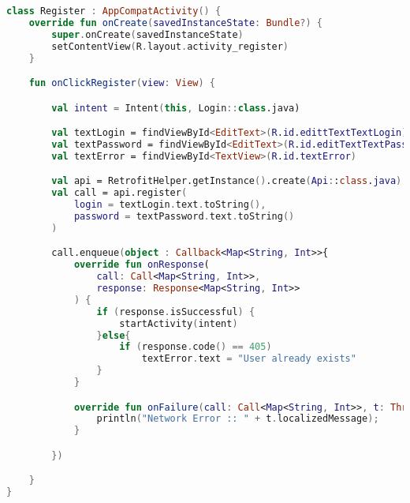 \begin{lstlisting}[language=Kotlin, caption=\leftline{Register}, label=lst:Register]
class Register : AppCompatActivity() {
    override fun onCreate(savedInstanceState: Bundle?) {
        super.onCreate(savedInstanceState)
        setContentView(R.layout.activity_register)
    }

    fun onClickRegister(view: View) {

        val intent = Intent(this, Login::class.java)

        val textLogin = findViewById<EditText>(R.id.edittTextTextLogin)
        val textPassword = findViewById<EditText>(R.id.editTextTextPassword)
        val textError = findViewById<TextView>(R.id.textError)

        val api = RetrofitHelper.getInstance().create(Api::class.java)
        val call = api.register(
            login = textLogin.text.toString(),
            password = textPassword.text.toString()
        )

        call.enqueue(object : Callback<Map<String, Int>>{
            override fun onResponse(
                call: Call<Map<String, Int>>,
                response: Response<Map<String, Int>>
            ) {
                if (response.isSuccessful) {
                    startActivity(intent)
                }else{
                    if (response.code() == 405)
                        textError.text = "User already exists"
                }
            }

            override fun onFailure(call: Call<Map<String, Int>>, t: Throwable) {
                println("Network Error :: " + t.localizedMessage);
            }

        })

    }
}
\end{lstlisting}

